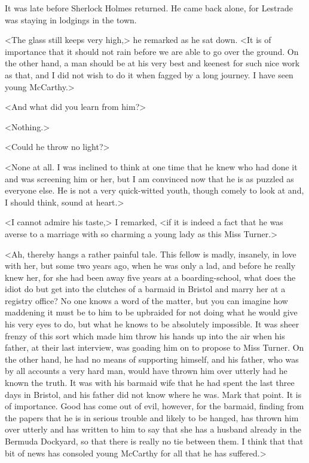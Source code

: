 It was late before Sherlock Holmes returned. He came back alone, for Lestrade was staying in lodgings in the town.

<The glass still keeps very high,> he remarked as he sat down. <It is of importance that it should not rain before we are able to go over the ground. On the other hand, a man should be at his very best and keenest for such nice work as that, and I did not wish to do it when fagged by a long journey. I have seen young McCarthy.>

<And what did you learn from him?>

<Nothing.>

<Could he throw no light?>

<None at all. I was inclined to think at one time that he knew who had done it and was screening him or her, but I am convinced now that he is as puzzled as everyone else. He is not a very quick-witted youth, though comely to look at and, I should think, sound at heart.>

<I cannot admire his taste,> I remarked, <if it is indeed a fact that he was averse to a marriage with so charming a young lady as this Miss Turner.>

<Ah, thereby hangs a rather painful tale. This fellow is madly, insanely, in love with her, but some two years ago, when he was only a lad, and before he really knew her, for she had been away five years at a boarding-school, what does the idiot do but get into the clutches of a barmaid in Bristol and marry her at a registry office? No one knows a word of the matter, but you can imagine how maddening it must be to him to be upbraided for not doing what he would give his very eyes to do, but what he knows to be absolutely impossible. It was sheer frenzy of this sort which made him throw his hands up into the air when his father, at their last interview, was goading him on to propose to Miss Turner. On the other hand, he had no means of supporting himself, and his father, who was by all accounts a very hard man, would have thrown him over utterly had he known the truth. It was with his barmaid wife that he had spent the last three days in Bristol, and his father did not know where he was. Mark that point. It is of importance. Good has come out of evil, however, for the barmaid, finding from the papers that he is in serious trouble and likely to be hanged, has thrown him over utterly and has written to him to say that she has a husband already in the Bermuda Dockyard, so that there is really no tie between them. I think that that bit of news has consoled young McCarthy for all that he has suffered.>

